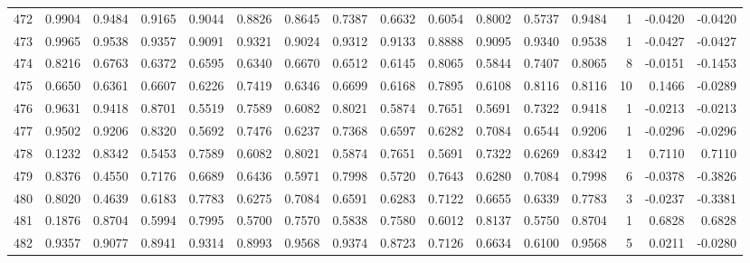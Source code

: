 \begin{tabular}{lrrrrrrrrrrrrrrr}
472 &      0.9904 &  0.9484 &  0.9165 &  0.9044 &  0.8826 &  0.8645 &  0.7387 &  0.6632 &  0.6054 &  0.8002 &   0.5737 &     0.9484 &      1 &                   -0.0420 &                    -0.0420 \\
473 &      0.9965 &  0.9538 &  0.9357 &  0.9091 &  0.9321 &  0.9024 &  0.9312 &  0.9133 &  0.8888 &  0.9095 &   0.9340 &     0.9538 &      1 &                   -0.0427 &                    -0.0427 \\
474 &      0.8216 &  0.6763 &  0.6372 &  0.6595 &  0.6340 &  0.6670 &  0.6512 &  0.6145 &  0.8065 &  0.5844 &   0.7407 &     0.8065 &      8 &                   -0.0151 &                    -0.1453 \\
475 &      0.6650 &  0.6361 &  0.6607 &  0.6226 &  0.7419 &  0.6346 &  0.6699 &  0.6168 &  0.7895 &  0.6108 &   0.8116 &     0.8116 &     10 &                    0.1466 &                    -0.0289 \\
476 &      0.9631 &  0.9418 &  0.8701 &  0.5519 &  0.7589 &  0.6082 &  0.8021 &  0.5874 &  0.7651 &  0.5691 &   0.7322 &     0.9418 &      1 &                   -0.0213 &                    -0.0213 \\
477 &      0.9502 &  0.9206 &  0.8320 &  0.5692 &  0.7476 &  0.6237 &  0.7368 &  0.6597 &  0.6282 &  0.7084 &   0.6544 &     0.9206 &      1 &                   -0.0296 &                    -0.0296 \\
478 &      0.1232 &  0.8342 &  0.5453 &  0.7589 &  0.6082 &  0.8021 &  0.5874 &  0.7651 &  0.5691 &  0.7322 &   0.6269 &     0.8342 &      1 &                    0.7110 &                     0.7110 \\
479 &      0.8376 &  0.4550 &  0.7176 &  0.6689 &  0.6436 &  0.5971 &  0.7998 &  0.5720 &  0.7643 &  0.6280 &   0.7084 &     0.7998 &      6 &                   -0.0378 &                    -0.3826 \\
480 &      0.8020 &  0.4639 &  0.6183 &  0.7783 &  0.6275 &  0.7084 &  0.6591 &  0.6283 &  0.7122 &  0.6655 &   0.6339 &     0.7783 &      3 &                   -0.0237 &                    -0.3381 \\
481 &      0.1876 &  0.8704 &  0.5994 &  0.7995 &  0.5700 &  0.7570 &  0.5838 &  0.7580 &  0.6012 &  0.8137 &   0.5750 &     0.8704 &      1 &                    0.6828 &                     0.6828 \\
482 &      0.9357 &  0.9077 &  0.8941 &  0.9314 &  0.8993 &  0.9568 &  0.9374 &  0.8723 &  0.7126 &  0.6634 &   0.6100 &     0.9568 &      5 &                    0.0211 &                    -0.0280 \\

\end{tabular}
